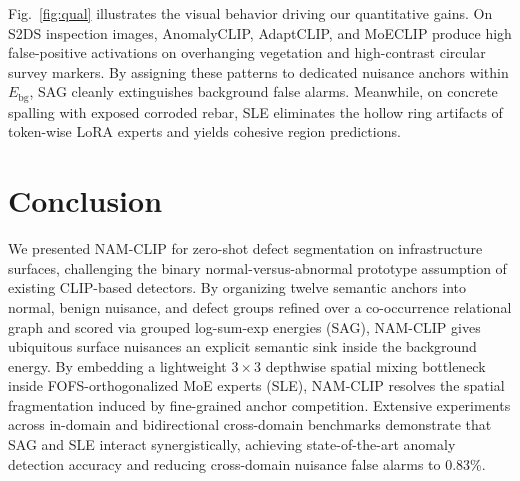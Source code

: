 \documentclass[conference]{IEEEtran}
\newcommand{\method}{NAM-CLIP}
\newcommand{\sag}{SAG}
\newcommand{\sle}{SLE}
\begin{document}
Fig.~\ref{fig:qual} illustrates the visual behavior driving our quantitative gains. On S2DS inspection images, AnomalyCLIP, AdaptCLIP, and MoECLIP produce high false-positive activations on overhanging vegetation and high-contrast circular survey markers. By assigning these patterns to dedicated nuisance anchors within $E_{\mathrm{bg}}$, \sag{} cleanly extinguishes background false alarms. Meanwhile, on concrete spalling with exposed corroded rebar, \sle{} eliminates the hollow ring artifacts of token-wise LoRA experts and yields cohesive region predictions.

\section{Conclusion}

We presented \method{} for zero-shot defect segmentation on infrastructure surfaces, challenging the binary normal-versus-abnormal prototype assumption of existing CLIP-based detectors. By organizing twelve semantic anchors into normal, benign nuisance, and defect groups refined over a co-occurrence relational graph and scored via grouped log-sum-exp energies (\sag{}), \method{} gives ubiquitous surface nuisances an explicit semantic sink inside the background energy. By embedding a lightweight $3{\times}3$ depthwise spatial mixing bottleneck inside FOFS-orthogonalized MoE experts (\sle{}), \method{} resolves the spatial fragmentation induced by fine-grained anchor competition. Extensive experiments across in-domain and bidirectional cross-domain benchmarks demonstrate that \sag{} and \sle{} interact synergistically, achieving state-of-the-art anomaly detection accuracy and reducing cross-domain nuisance false alarms to 0.83\%.
\end{document}
